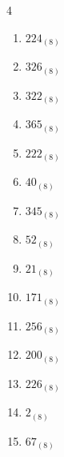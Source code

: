 \begin{multicols}{4}
\begin{enumerate}
        \phantom{$=244$}

  \item $224_{(8)}$

        \phantom{$=148$}

  \item $326_{(8)}$

        \phantom{$=214$}

  \item $322_{(8)}$

        \phantom{$=210$}

  \item $365_{(8)}$

        \phantom{$=245$}

  \item $222_{(8)}$

        \phantom{$=146$}

  \item $40_{(8)}$

        \phantom{$=32$}

  \item $345_{(8)}$

        \phantom{$=229$}

  \item $52_{(8)}$

        \phantom{$=42$}

  \item $21_{(8)}$

        \phantom{$=17$}

  \item $171_{(8)}$

        \phantom{$=121$}

  \item $256_{(8)}$

        \phantom{$=174$}

\columnbreak %

\resetques

  \item $200_{(8)}$

        \phantom{$=128$}

  \item $226_{(8)}$

        \phantom{$=150$}

  \item $2_{(8)}$

        \phantom{$=2$}

  \item $67_{(8)}$


\end{enumerate}
\end{multicols}
